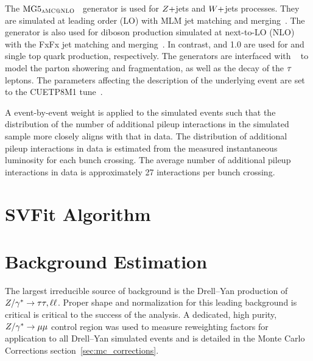 The $\text{MG5}_\textsc{aMC@NLO}$~\cite{Alwall:2014hca} generator is used for $Z+$jets and $W+$jets processes. 
They are simulated at leading order (LO) with MLM jet matching and merging~\cite{Alwall:2007fs}.
The \aMCATNLO generator is also used for diboson production simulated at next-to-LO (NLO) with the 
FxFx jet matching and merging~\cite{Frederix:2012ps}. In contrast,  and 1.0 are used for \ttbar
and single top quark production, respectively. The generators are interfaced with  ~\cite{Sjostrand:2014zea} to model the parton showering and fragmentation, as well as 
the decay of the $\tau$ leptons. The \PYTHIA parameters affecting the description of the 
underlying event are set to the {CUETP8M1} tune~\cite{Khachatryan:2015pea}.

A event-by-event weight is applied to the simulated events such that the distribution of the 
number of additional pileup interactions in the simulated sample more closely aligns with that in data.
The distribution of additional pileup interactions in data is estimated from the measured instantaneous 
luminosity for each bunch crossing. The average number of additional pileup interactions in
data is approximately 27 interactions per bunch crossing.



\section{SVFit Algorithm}



\section{Background Estimation}
The largest irreducible source of background is the Drell--Yan production
of $Z/\gamma^*\to\tau\tau, \ell\ell$. Proper shape and normalization for this
leading background is critical is critical to the success of the analysis.
A dedicated, high purity, $Z/\gamma^*\to\mu\mu$ control region was
used to measure reweighting factors for application to all Drell--Yan
simulated events and is detailed in the Monte Carlo Corrections 
section~\ref{sec:mc_corrections}.

